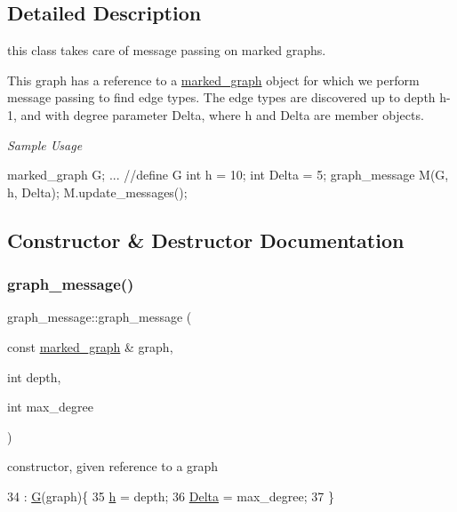\subsection{Detailed Description}
this class takes care of message passing on marked graphs. 

This graph has a reference to a \hyperlink{classmarked__graph}{marked\+\_\+graph} object for which we perform message passing to find edge types. The edge types are discovered up to depth h-\/1, and with degree parameter Delta, where h and Delta are member objects.

{\itshape Sample Usage} \begin{DoxyVerb} marked_graph G;
 ... //define G
 int h = 10;
 int Delta = 5; 
 graph_message M(G, h, Delta);
 M.update_messages();\end{DoxyVerb}
 

\subsection{Constructor \& Destructor Documentation}
\mbox{\label{classgraph__message_a792e738b94a19f914e5495c416defe4d}} 
\subsubsection{\texorpdfstring{graph\+\_\+message()}{graph\_message()}}
{\footnotesize\ttfamily graph\+\_\+message\+::graph\+\_\+message (\begin{DoxyParamCaption}\item[{const \hyperlink{classmarked__graph}{marked\+\_\+graph} \&}]{graph,  }\item[{int}]{depth,  }\item[{int}]{max\+\_\+degree }\end{DoxyParamCaption})\hspace{0.3cm}{\ttfamily [inline]}}



constructor, given reference to a graph 


\begin{DoxyCode}
34                                                                      : \hyperlink{classgraph__message_abffce6d6a7868da0e747425569759f0f}{G}(graph)\{
35     \hyperlink{classgraph__message_a934d63ed7275c211e13c6fb68824ed46}{h} = depth;
36     \hyperlink{classgraph__message_a45dfd061b7bc73572e5132fbf66efd55}{Delta} = max\_degree;
37   \}
\end{DoxyCode}


